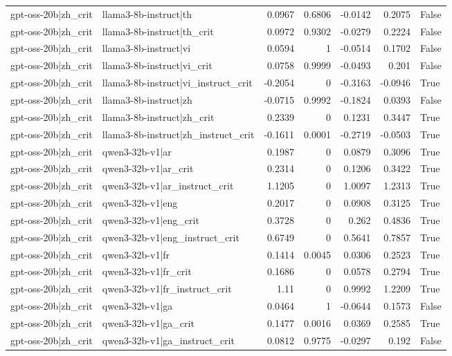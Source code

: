 \begin{table}
\begin{tabular}{l l r r r r l}
gpt-oss-20b|zh_crit & llama3-8b-instruct|th & 0.0967 & 0.6806 & -0.0142 & 0.2075 & False \\
gpt-oss-20b|zh_crit & llama3-8b-instruct|th_crit & 0.0972 & 0.9302 & -0.0279 & 0.2224 & False \\
gpt-oss-20b|zh_crit & llama3-8b-instruct|vi & 0.0594 & 1 & -0.0514 & 0.1702 & False \\
gpt-oss-20b|zh_crit & llama3-8b-instruct|vi_crit & 0.0758 & 0.9999 & -0.0493 & 0.201 & False \\
gpt-oss-20b|zh_crit & llama3-8b-instruct|vi_instruct_crit & -0.2054 & 0 & -0.3163 & -0.0946 & True \\
gpt-oss-20b|zh_crit & llama3-8b-instruct|zh & -0.0715 & 0.9992 & -0.1824 & 0.0393 & False \\
gpt-oss-20b|zh_crit & llama3-8b-instruct|zh_crit & 0.2339 & 0 & 0.1231 & 0.3447 & True \\
gpt-oss-20b|zh_crit & llama3-8b-instruct|zh_instruct_crit & -0.1611 & 0.0001 & -0.2719 & -0.0503 & True \\
gpt-oss-20b|zh_crit & qwen3-32b-v1|ar & 0.1987 & 0 & 0.0879 & 0.3096 & True \\
gpt-oss-20b|zh_crit & qwen3-32b-v1|ar_crit & 0.2314 & 0 & 0.1206 & 0.3422 & True \\
gpt-oss-20b|zh_crit & qwen3-32b-v1|ar_instruct_crit & 1.1205 & 0 & 1.0097 & 1.2313 & True \\
gpt-oss-20b|zh_crit & qwen3-32b-v1|eng & 0.2017 & 0 & 0.0908 & 0.3125 & True \\
gpt-oss-20b|zh_crit & qwen3-32b-v1|eng_crit & 0.3728 & 0 & 0.262 & 0.4836 & True \\
gpt-oss-20b|zh_crit & qwen3-32b-v1|eng_instruct_crit & 0.6749 & 0 & 0.5641 & 0.7857 & True \\
gpt-oss-20b|zh_crit & qwen3-32b-v1|fr & 0.1414 & 0.0045 & 0.0306 & 0.2523 & True \\
gpt-oss-20b|zh_crit & qwen3-32b-v1|fr_crit & 0.1686 & 0 & 0.0578 & 0.2794 & True \\
gpt-oss-20b|zh_crit & qwen3-32b-v1|fr_instruct_crit & 1.11 & 0 & 0.9992 & 1.2209 & True \\
gpt-oss-20b|zh_crit & qwen3-32b-v1|ga & 0.0464 & 1 & -0.0644 & 0.1573 & False \\
gpt-oss-20b|zh_crit & qwen3-32b-v1|ga_crit & 0.1477 & 0.0016 & 0.0369 & 0.2585 & True \\
gpt-oss-20b|zh_crit & qwen3-32b-v1|ga_instruct_crit & 0.0812 & 0.9775 & -0.0297 & 0.192 & False \\

\end{tabular}
\end{table}
